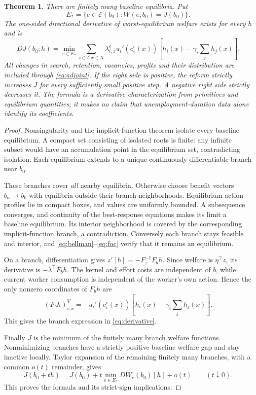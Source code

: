 \documentclass[11pt]{article}
\newtheorem{theorem}{Theorem}
\begin{document}
\begin{theorem}\label{thm:derivative}
There are finitely many baseline equilibria. Put
\[
 E_* =\{e\in\mathcal E(b_0):W(e,b_0)=J(b_0)\}.
\]
The one-sided directional derivative of worst-equilibrium welfare exists for every $h$ and is
\begin{equation}\label{eq:derivative}
 DJ(b_0;h)=\min_{e\in E_*}
 \sum_{i\in I,x\in X}\lambda^e_{i,x}u_i'(c_i^e(x))
       \left[h_i(x)-\gamma_i\sum_jh_j(x)\right].
\end{equation}
All changes in search, retention, vacancies, profits and their distribution are included through \eqref{eq:adjoint}. If the right side is positive, the reform strictly increases $J$ for every sufficiently small positive step. A negative right side strictly decreases it. The formula is a derivative characterization from primitives and equilibrium quantities; it makes no claim that unemployment-duration data alone identify its coefficients.
\end{theorem}
\begin{proof}
Nonsingularity and the implicit-function theorem isolate every baseline equilibrium. A compact set consisting of isolated roots is finite: any infinite subset would have an accumulation point in the equilibrium set, contradicting isolation. Each equilibrium extends to a unique continuously differentiable branch near $b_0$.

These branches cover \emph{all} nearby equilibria. Otherwise choose benefit vectors $b_n\to b_0$ with equilibria outside their branch neighborhoods. Equilibrium action profiles lie in compact boxes, and values are uniformly bounded. A subsequence converges, and continuity of the best-response equations makes its limit a baseline equilibrium. Its interior neighborhood is covered by the corresponding implicit-function branch, a contradiction. Conversely each branch stays feasible and interior, and \eqref{eq:bellman}--\eqref{eq:foc} verify that it remains an equilibrium.

On a branch, differentiation gives $z'[h]=-F_z^{-1}F_bh$. Since welfare is $\eta^\top z$, its derivative is $-\lambda^\top F_bh$. The kernel and effort costs are independent of $b$, while current worker consumption is independent of the worker's own action. Hence the only nonzero coordinates of $F_bh$ are
\[
 (F_bh)^V_{i,x}=-u_i'(c_i^e(x))
            \left[h_i(x)-\gamma_i\sum_jh_j(x)\right].
\]
This gives the branch expression in \eqref{eq:derivative}.

Finally $J$ is the minimum of the finitely many branch welfare functions. Nonminimizing branches have a strictly positive baseline welfare gap and stay inactive locally. Taylor expansion of the remaining finitely many branches, with a common $o(t)$ remainder, gives
\[
 J(b_0+th)=J(b_0)+t\min_{e\in E_*}DW_e(b_0)[h]+o(t)
 \qquad(t\downarrow0).
\]
This proves the formula and its strict-sign implications.
\end{proof}
\end{document}
